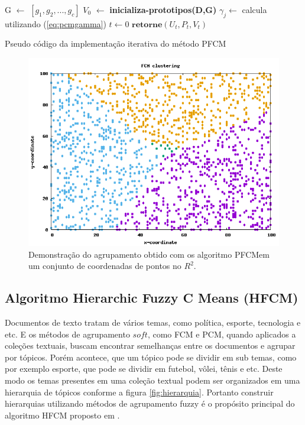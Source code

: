 \begin{algorithm}[H] 
  \SetAlgoLined {} 
  G $\gets$ $[g_1,g_2,...,g_c]$\; 
  $V_0$ $\gets$ \textbf{{\color{blue}inicializa-prototipos}(D,G)}\; 
  $\gamma_j \gets$ calcula utilizando (\ref{eq:pcmgamma})\;
  $t \gets 0$\; 
  $\textbf{retorne} (U_t,P_t,V_t)$\; 
  \caption{Pseudo código da implementação iterativa do método PFCM}
  \label{alg:pfcm} 
\end{algorithm}

\begin{figure}[!htp] 
  \centering 
  \includegraphics[width=0.6\columnwidth]{assets/samples_pfcm.png}
  \caption{Demonstração do agrupamento obtido com os algoritmo 
    PFCM\protect\footnotemark em um conjunto de coordenadas de pontos no $R^2$.} 
  \label{fig:samples_pfcm} 
\end{figure}

\subsection{Algoritmo Hierarchic Fuzzy C Means (HFCM)}

Documentos de texto tratam de vários temas, como política, esporte, tecnologia e etc.
E os métodos de agrupamento $soft$, como FCM e PCM, quando aplicados a coleções textuais, buscam
encontrar semelhanças entre os documentos e agrupar por tópicos. Porém acontece, que um
tópico pode se dividir em sub temas, como por exemplo esporte, que pode se dividir em futebol,
vôlei, tênis e etc. Deste modo os temas presentes em uma coleção textual podem ser organizados 
em uma hierarquia de tópicos conforme a figura \ref{fig:hierarquia}. Portanto construir hierarquias
utilizando métodos de agrupamento fuzzy é o propósito principal do algoritmo HFCM proposto em
\cite{PedryczR2006}.

